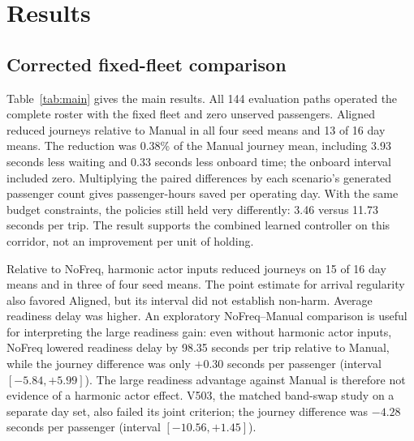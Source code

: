 \section{Results}

\subsection{Corrected fixed-fleet comparison}
Table~\ref{tab:main} gives the main results. All 144 evaluation paths operated the complete roster with the fixed fleet and zero unserved passengers. Aligned reduced journeys relative to Manual in all four seed means and 13 of 16 day means. The reduction was 0.38\% of the Manual journey mean, including 3.93 seconds less waiting and 0.33 seconds less onboard time; the onboard interval included zero. Multiplying the paired differences by each scenario's generated passenger count gives  passenger-hours saved per operating day. With the same budget constraints, the policies still held very differently: 3.46 versus 11.73 seconds per trip. The result supports the combined learned controller on this corridor, not an improvement per unit of holding.

\begin{table}[!ht]
\centering\small
\caption{Main paired comparison on 16 new MBTA-informed simulation days (V504). Entries are Aligned minus the comparator, with pointwise 95\% seed-by-day bootstrap intervals. Negative values favor Aligned. Absolute offset is measured against the original nominal timetable.}
\label{tab:main}

\end{table}

Relative to NoFreq, harmonic actor inputs reduced journeys on 15 of 16 day means and in three of four seed means. The point estimate for arrival regularity also favored Aligned, but its interval did not establish non-harm. Average readiness delay was higher. An exploratory NoFreq--Manual comparison is useful for interpreting the large readiness gain: even without harmonic actor inputs, NoFreq lowered readiness delay by 98.35 seconds per trip relative to Manual, while the journey difference was only $+0.30$ seconds per passenger (interval $[-5.84,+5.99]$). The large readiness advantage against Manual is therefore not evidence of a harmonic actor effect. V503, the matched band-swap study on a separate day set, also failed its joint criterion; the journey difference was $-4.28$ seconds per passenger (interval $[-10.56,+1.45]$).

